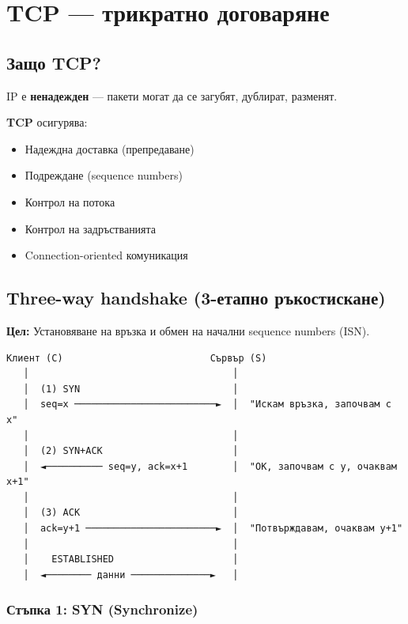 \documentclass[12pt,a4paper]{article}
\begin{document}
\newpage
\section{TCP — трикратно договаряне}

\subsection{Защо TCP?}

IP е \textbf{ненадежден} — пакети могат да се загубят, дублират, разменят.

\textbf{TCP} осигурява:
\begin{itemize}
    \item[$\checkmark$] Надеждна доставка (препредаване)
    \item[$\checkmark$] Подреждане (sequence numbers)
    \item[$\checkmark$] Контрол на потока
    \item[$\checkmark$] Контрол на задръстванията
    \item[$\checkmark$] Connection-oriented комуникация
\end{itemize}

\subsection{Three-way handshake (3-етапно ръкостискане)}

\textbf{Цел:} Установяване на връзка и обмен на начални sequence numbers (ISN).

\begin{lstlisting}
Клиент (C)                          Сървър (S)
   │                                    │
   │  (1) SYN                           │
   │  seq=x ─────────────────────────►  │  "Искам връзка, започвам с x"
   │                                    │
   │  (2) SYN+ACK                       │
   │  ◄────────── seq=y, ack=x+1        │  "ОК, започвам с y, очаквам x+1"
   │                                    │
   │  (3) ACK                           │
   │  ack=y+1 ───────────────────────►  │  "Потвърждавам, очаквам y+1"
   │                                    │
   │    ESTABLISHED                     │
   │  ◄──────── данни ──────────────►   │
\end{lstlisting}

\subsubsection{Стъпка 1: SYN (Synchronize)}
\end{document}
